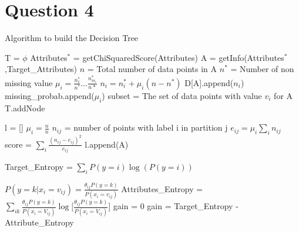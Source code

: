 \documentclass{article}
\begin{document}
\section*{Question 4}
\begin{algorithm}[H]
	\caption{Algorithm to build the Decision Tree}\label{Decision tree}
	\begin{algorithmic}[1]
			\State T = $\phi$ 
			\State {}
			\State {}
			\Else
			\State Attributes$^*$ = getChiSquaredScore(Attributes)
			\State A = getInfo(Attributes$^*$,Target\_Attributes)
					\State $n$ = Total number of data points in A
					\State $n^*$ = Number of non missing value
					\State $\mu_i = \frac{n_1^*}{n^*} \hdots \frac{n^*_{m_i}}{n*} $
					\State $n_i = n^*_i + \mu_i(n-n^*)$
					\State D[A].append($n_i$) 
					\State missing\_probab.append($\mu_i$)  
				\EndIf
				\State subset = The set of data points with value $v_i$ for A
				T.addNode
			\EndFor
			\EndIf
		\EndProcedure
		
		\State l = [] 
		\State $\mu_i = \frac{n}{n}$ 
		\State $n_{ij}$ = number of points with label i in partition j
		\State $e_{ij} = \mu_i \sum_{i}^{} n_{ij} $
		\State score = $\sum_{i}^{} \frac{(n_{ij} - e_{ij} )^2}{e_{ij}}$
			l.append(A)
		\EndIf 
		\EndFor
		 
		\EndProcedure
		
			\State Target\_Entropy = $\sum_{i}^{} P(y=i)\log(P(y=i))$ 
			
			\Comment $P(y=k | x_i = v_{ij}) = \frac{\theta_{ij}P(y=k)}{P(x_i = v_{ij})}$
			\State Attributes\_Entropy = $\sum_{ik}^{} \frac{\theta_{ij} P(y=k)}{P(x_{i} = V_{ij})} \log \Big[ \frac{\theta_{ij} P(y=k)}{P(x_{i} = V_{ij})}\Big] $
			\State gain = 0
			\State gain = Target\_Entropy - Attribute\_Entropy
			\EndFor
		\EndProcedure
	\end{algorithmic}
	\end{algorithm}
\end{document}

